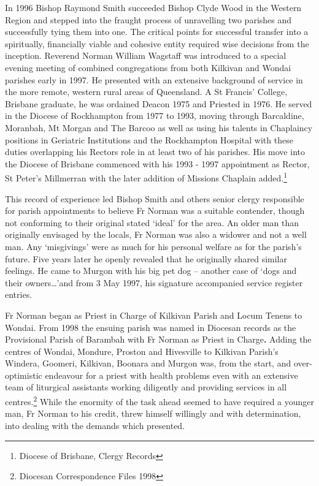 In 1996 Bishop Raymond Smith succeeded Bishop Clyde Wood in the Western Region and stepped into the fraught process of unravelling two parishes and successfully tying them into one. The critical points for successful transfer into a spiritually, financially viable and cohesive entity required wise decisions from the inception. Reverend Norman William Wagstaff was introduced to a special evening meeting of combined congregations from both Kilkivan and Wondai parishes early in 1997. He presented with an extensive background of service in the more remote, western rural areas of Queensland. A St Francis' College, Brisbane graduate, he was ordained Deacon 1975 and Priested in 1976. He served in the Diocese of Rockhampton from 1977 to 1993, moving through Barcaldine, Moranbah, Mt Morgan and The Barcoo as well as using his talents in Chaplaincy positions in Geriatric Institutions and the Rockhampton Hospital with these duties overlapping his Rectors role in at least two of his parishes. His move into the Diocese of Brisbane commenced with his 1993 - 1997 appointment as Rector, St Peter's Millmerran with the later addition of Missions Chaplain added.\footnote{Diocese of Brisbane, Clergy Records}


This record of experience led Bishop Smith and others senior clergy responsible for parish appointments to believe Fr Norman was a suitable contender, though not conforming to their original stated `ideal' for the area. An older man than originally envisaged by the locals, Fr Norman was also a widower and not a well man. Any `misgivings' were as much for his personal welfare as for the parish's future. Five years later he openly revealed that he originally shared similar feelings. He came to Murgon with his big pet dog -- another case of `dogs and their owners\ldots'and from 3 May 1997, his signature accompanied service register entries.



Fr Norman began as Priest in Charge of Kilkivan Parish and Locum Tenens to Wondai. From 1998 the ensuing parish was named in Diocesan records as the Provisional Parish of Barambah with Fr Norman as Priest in Charge\textbf{.} Adding the centres of Wondai, Mondure, Proston and Hivesville to Kilkivan Parish's Windera, Goomeri, Kilkivan, Boonara and Murgon was, from the start, and over-optimistic endeavour for a priest with health problems even with an extensive team of liturgical assistants working diligently and providing services in all centres.\footnote{Diocesan Correspondence Files 1998} While the enormity of the task ahead seemed to have required a younger man, Fr Norman to his credit, threw himself willingly and with determination, into dealing with the demands which presented.


